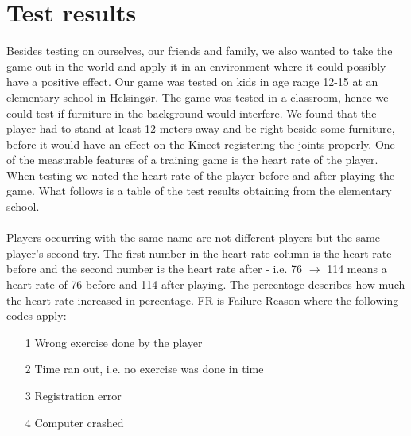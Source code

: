 \documentclass[11pt]{report}
\begin{document}
\section{Test results}
Besides testing on ourselves, our friends and family, we also wanted to take the game out in the world and apply it in an environment where it could possibly have a positive effect. Our game was tested on kids in age range 12-15 at an elementary school in Helsing\o r. The game was tested in a classroom, hence we could test if furniture in the background would interfere. We found that the player had to stand at least 12 meters away and be right beside some furniture, before it would have an effect on the Kinect registering the joints properly. One of the measurable features of a training game is the heart rate of the player. When testing we noted the heart rate of the player before and after playing the game. What follows is a table of the test results obtaining from the elementary school.\\
\\
Players occurring with the same name are not different players but the same player's second try. The first number in the heart rate column is the heart rate before and the second number is the heart rate after - i.e. 76 $\rightarrow$ 114 means a heart rate of 76 before and 114 after playing. The percentage describes how much the heart rate increased in percentage. FR is Failure Reason where the following codes apply:
\begin{itemize}
\item[1] Wrong exercise done by the player
\item[2] Time ran out, i.e. no exercise was done in time
\item[3] Registration error
\item[4] Computer crashed
\end{itemize}
\end{document}
